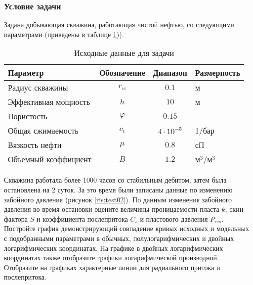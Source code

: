 \subsubsection{Условие задачи}
Задана добывающая скважина, работающая чистой нефтью, со следующими параметрами (приведены в таблице \ref{table:test_data2})).

\begin{table}[h!]
	\ttabbox
	{
		\caption{Исходные данные для задачи}
		\label{table:test_data2}
	}
	{
		\begin{tabular}{|l|c|c|l|}
			\hline
			\rowcolor{lightgray}	Параметр& Обозначение &Диапазон &Размерность \\
			\hline
			Радиус скважины&  $r_{w} $&$ 0.1 $ &м \\
			\hline
			Эффективная мощность & $h $&$ 10$ &м  \\
			\hline
			Пористость & $\varphi $&$ 0.15 $&  \\
			\hline
			Общая сжимаемость& $c_{t} $&$ 4\cdot 10^{-5}  $ & 1/бар  \\
			\hline
			Вязкость нефти& $\mu $&$ 0.8$& сП  \\
			\hline
			Объемный коэффициент   &$B $&$ 1.2$& м$^3$/м$^3$  \\
			\hline
		\end{tabular}
		
	}
\end{table}

Скважина работала более 1000 часов со стабильным дебитом, затем была остановлена на 2 суток. За это время были записаны данные по изменению забойного давления (рисунок \ref{ris:test02}). По данным изменения забойного давления во время остановки оцените величины проницаемости пласта $k$, скин-фактора $S$ и коэффициента послепритока $C_s$ и пластового давления $P_{res} $. Постройте график демонстрирующий совпадение кривых исходных и модельных с подобранными параметрами в обычных, полулогарифмических и двойных логарифмических координатах. На графике в двойных логарифмических координатах также отобразите графики логарифмической производной. Отобразите на графиках характерные линии для радиального притока и послепритока.

